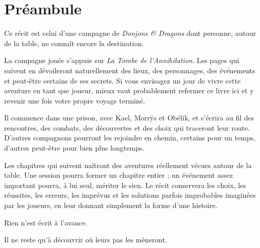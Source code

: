 \chapter*{Préambule}

Ce récit est celui d'une campagne de \emph{Donjons \& Dragons} dont personne,
autour de la table, ne connaît encore la destination.

La campagne jouée s'appuie sur \emph{La Tombe de l'Annihilation}. Les pages qui
suivent en dévoileront naturellement des lieux, des personnages, des événements
et peut-être certains de ses secrets. Si vous envisagez un jour de vivre cette
aventure en tant que joueur, mieux vaut probablement refermer ce livre ici et
y revenir une fois votre propre voyage terminé.

Il commence dans une prison, avec Kael, Morrÿs et Obélik, et s'écrira au fil
des rencontres, des combats, des découvertes et des choix qui traceront leur
route. D'autres compagnons pourront les rejoindre en chemin, certains pour un
temps, d'autres peut-être pour bien plus longtemps.

Les chapitres qui suivent naîtront des aventures réellement vécues autour de
la table. Une session pourra former un chapitre entier ; un événement assez
important pourra, à lui seul, mériter le sien. Le récit conservera les choix,
les réussites, les erreurs, les imprévus et les solutions parfois improbables
imaginées par les joueurs, en leur donnant simplement la forme d'une histoire.

Rien n'est écrit à l'avance.

Il ne reste qu'à découvrir où leurs pas les mèneront.
